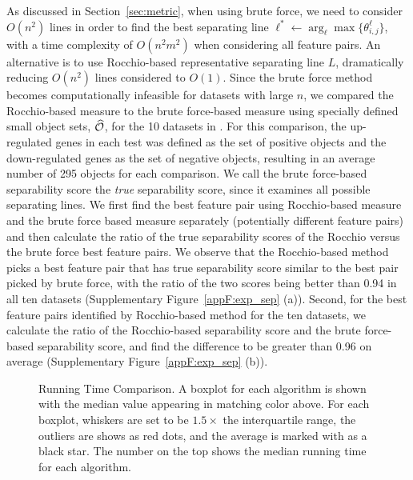  As discussed in Section~\ref{sec:metric}, when using brute force, we need to consider $O(n^2)$ lines in order to find the best separating line $\ell^* \leftarrow \arg_\ell \max \{\theta_{i,j}^{\ell}\}$, with a time complexity of $O(n^2m^2)$ when considering all feature pairs. An alternative is to use Rocchio-based representative separating line $L$, dramatically reducing $O(n^2)$ lines considered to $O(1)$. Since the brute force method becomes computationally infeasible for datasets with large $n$, we compared the Rocchio-based measure to the brute force-based measure using
specially defined small object sets, $\widehat{{\mathcal{O}}}$, for the 10 datasets in \msig. For this comparison, the up-regulated genes in each \msig test was defined as the set of positive objects and the down-regulated genes as the set of negative objects, resulting in an average number of 295 objects for each comparison. We call the brute force-based separability score the {\em true} separability score, since it examines all possible separating lines. We first find the best feature pair using Rocchio-based measure and the brute force based measure separately (potentially different feature pairs) and then calculate the ratio of the true separability scores of the Rocchio versus the brute force best feature pairs. We observe that the Rocchio-based method picks a best feature pair that has true separability score similar to the best pair picked by brute force, with the ratio of the two scores being better than 0.94 in all ten datasets (Supplementary Figure~\ref{appF:exp_sep} (a)). Second, for the best feature pairs identified by Rocchio-based method for the ten datasets, we calculate the ratio of the Rocchio-based separability score and the brute force-based separability score, and find the difference to be greater than 0.96 on average (Supplementary Figure~\ref{appF:exp_sep} (b)).

\begin{figure}[h]
\vspace{-5mm}
\centering %
{}
\vspace{-5mm}
\caption{Running Time Comparison. A boxplot for each algorithm is shown with the median value appearing in matching color above. For each boxplot, whiskers are set to be $1.5\times$ the interquartile range, the outliers are shows as red dots, and the average is marked with as a black star. The number on the top shows the median running time for each algorithm.}
\vspace{-5mm}
\label{fig:time}
\end{figure}

